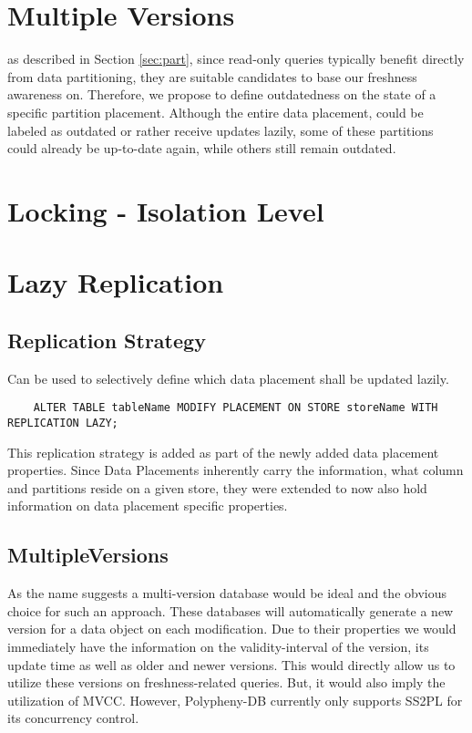 \section{Multiple Versions}

as described in Section \ref{sec:part}, since read-only queries typically benefit directly from data partitioning, they are suitable candidates to base our freshness awareness on.
Therefore, we propose to define outdatedness on the state of a specific partition placement.
Although the entire data placement, could be labeled as outdated or rather receive updates lazily, some of 
these partitions could already be up-to-date again, while others still remain outdated.




\section{Locking - Isolation Level}






\section{Lazy Replication}

\subsection{Replication Strategy}
Can be used to selectively define which data placement shall be updated lazily.
\begin{verbatim}
    ALTER TABLE tableName MODIFY PLACEMENT ON STORE storeName WITH REPLICATION LAZY;
\end{verbatim}

This replication strategy is added as part of the newly added data placement properties. Since Data Placements inherently carry the information, what column and partitions reside
on a given store, they were extended to now also hold information on data placement specific properties.


\subsection{MultipleVersions}
As the name suggests a multi-version database would be ideal and the obvious choice for such an approach.
These databases will automatically generate a new version for a data object on each modification.
Due to their properties we would immediately have the information on the validity-interval of the version, its update time as well as older and newer versions.
This would directly allow us to utilize these versions on freshness-related queries. But, it would also imply the utilization of MVCC.
However, Polypheny-DB currently only supports SS2PL for its concurrency control. 

